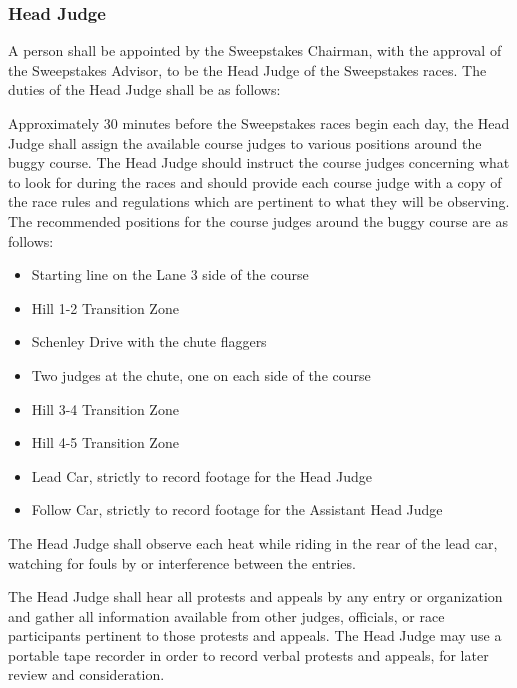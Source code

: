 \subsubsection{Head Judge}

	A person shall be appointed by the Sweepstakes Chairman, with the approval of the Sweepstakes Advisor, to be the Head Judge of the Sweepstakes races. The duties of the Head Judge shall be as follows:

	Approximately 30 minutes before the Sweepstakes races begin each day, the Head Judge shall assign the available course judges to various positions around the buggy course. The Head Judge should instruct the course judges concerning what to look for during the races and should provide each course judge with a copy of the race rules and regulations which are pertinent to what they will be observing. The recommended positions for the course judges around the buggy course are as follows:

	\begin{itemize}

		\item Starting line on the Lane 3 side of the course

		\item Hill 1-2 Transition Zone

		\item Schenley Drive with the chute flaggers

		\item Two judges at the chute, one on each side of the course

		\item Hill 3-4 Transition Zone

		\item Hill 4-5 Transition Zone

		\item Lead Car, strictly to record footage for the Head Judge

		\item Follow Car, strictly to record footage for the Assistant Head Judge

	\end{itemize}

	The Head Judge shall observe each heat while riding in the rear of the lead car, watching for fouls by or interference between the entries.

	The Head Judge shall hear all protests and appeals by any entry or organization and gather all information available from other judges, officials, or race participants pertinent to those protests and appeals. The Head Judge may use a portable tape recorder in order to record verbal protests and appeals, for later review and consideration.

